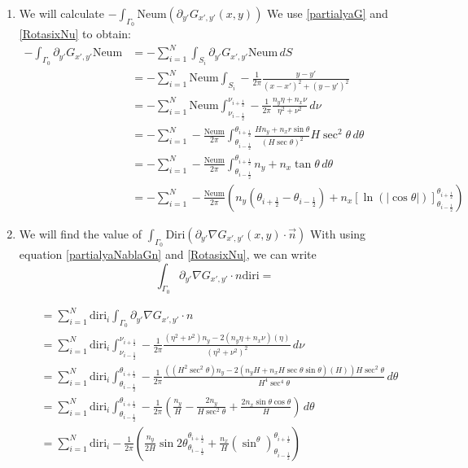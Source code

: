 \documentclass[a4paper,12pt]{article}
\newcommand{\integ}[3]{%
\ensuremath{\displaystyle{\int^{#2}_{#1} #3}}}
\begin{document}
\begin{enumerate}
\item We will calculate $-\integ{\Gamma_0}{}{\text{Neum} \left(\partial_{y'}G_{x',y'}(x,y)\right)}$
We use \ref{partialyaG} and \ref{RotasixNu} to obtain:
\begin{align}
 -\integ{\Gamma_0}{}{\partial_{y'} G_{x',y'} \text{Neum}}&=-\sum\limits_{i=1}^N  \integ{S_i}{}{\partial_{y'} G_{x',y'} \text{Neum} \, dS}\\
&=-\sum\limits_{i=1}^N \text{Neum} \integ{S_i}{}{-\frac{1}{2\pi}\frac{y-y'}{(x-x')^2+(y-y')^2}}\\
&=-\sum\limits_{i=1}^N \text{Neum} \integ{\nu_{i-\frac{1}{2}}}{\nu_{i+\frac{1}{2}}}{-\frac{1}{2\pi} \frac{n_y\eta+n_x \nu}{\eta^2+\nu^2} \, d\nu}\\
&=-\sum\limits_{i=1}^N -\frac{\text{Neum}}{2\pi} \integ{\theta_{i-\frac{1}{2}}}{\theta_{i+\frac{1}{2}}}{\frac{H n_y+n_x r \sin\theta}{\left( H\sec\theta\right)^2 }H \sec^2\theta \, d\theta}\\
&=-\sum\limits_{i=1}^N -\frac{\text{Neum}}{2\pi} \integ{\theta_{i-\frac{1}{2}}}{\theta_{i+\frac{1}{2}}}{n_y+n_x\tan\theta\, d\theta}\\
&=-\sum\limits_{i=1}^N -\frac{\text{Neum}}{2\pi} \left( n_y(\theta_{i+\frac{1}{2}}-\theta_{i-\frac{1}{2}}) +n_x \left[\ln(\vert \cos\theta\vert )\right]_{\theta_{i-\frac{1}{2}}}^{\theta_{i+\frac{1}{2}}} \right)\label{intPartialyaG}
\end{align}

\item We will find the value of $\integ{\Gamma_0}{}{\text{Diri}\left(\partial_{y'}\nabla G_{x',y'}(x,y)\cdot \vec{n}\right)}$
With using equation \ref{partialyaNablaGn} and \ref{RotasixNu}, we can write
\[
  \integ{\Gamma_0}{}{\partial_{y'}\nabla G_{x',y'} \cdot n \text{diri}}=
\]

\begin{align}
&=\sum\limits_{i=1}^N \text{diri}_i \integ{\Gamma_0}{}{\partial_{y'}\nabla G_{x',y'} \cdot n}\\
&=\sum\limits_{i=1}^N \text{diri}_i \integ{\nu_{i-\frac{1}{2}}}{\nu_{i+\frac{1}{2}}}{-\frac{1}{2\pi} \frac{(\eta^2+\nu^2)n_y-2(n_y\eta+n_x\nu)(\eta)}{(\eta^2+\nu^2)^2} \, d\nu}\\
&=\sum\limits_{i=1}^N \text{diri}_i \integ{\theta_{i-\frac{1}{2}}}{\theta_{i+\frac{1}{2}}}{-\frac{1}{2\pi} \frac{\left((H^2 \sec^2\theta)n_y-2(n_y H+n_x H \sec \theta \sin \theta)(H)\right)H \sec^2\theta}{H^4 \sec^4\theta} \, d\theta}\\
&=\sum\limits_{i=1}^N \text{diri}_i \integ{\theta_{i-\frac{1}{2}}}{\theta_{i+\frac{1}{2}}}{-\frac{1}{2\pi} \left( \frac{n_y}{H}-\frac{2n_y}{H \sec^2\theta}+\frac{2n_x \sin \theta \cos\theta}{H} \right) \, d\theta}\\
&=\sum\limits_{i=1}^N \text{diri}_i -\frac{1}{2\pi} \left(\frac{n_y}{2H}\sin2\theta_{\theta_{i-\frac{1}{2}}}^{\theta_{i+\frac{1}{2}}}+\frac{n_x}{H}(\sin^\theta)_{\theta_{i-\frac{1}{2}}}^{\theta_{i+\frac{1}{2}}}\right)\label{intPartialyaNablaGn}
\end{align}

\end{enumerate}
\end{document}
